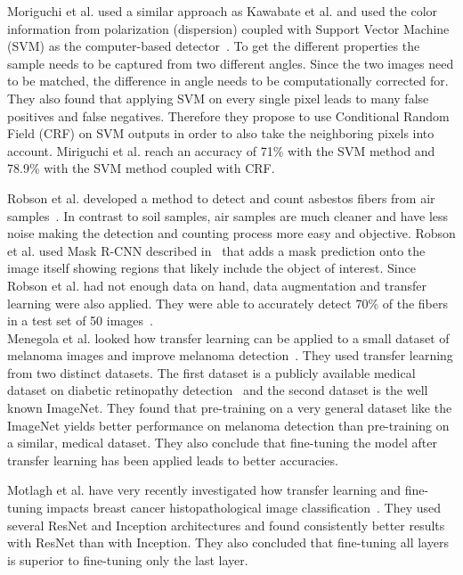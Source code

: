 Moriguchi et al. used a similar approach as Kawabate et al. and used the color information from polarization (dispersion) coupled with Support Vector Machine (SVM) as the computer-based detector~\cite{moriguchi2008asbestos}. To get the different properties the sample needs to be captured from two different angles. Since the two images need to be matched, the difference in angle needs to be computationally corrected for. They also found that applying SVM on every single pixel leads to many false positives and false negatives. Therefore they propose to use Conditional Random Field (CRF) on SVM outputs in order to also take the neighboring pixels into account. Miriguchi et al. reach an accuracy of 71\% with the SVM method and 78.9\% with the SVM method coupled with CRF.

Robson et al. developed a method to detect and count asbestos fibers from air samples~\cite{robson2018fiac}. In contrast to soil samples, air samples are much cleaner and have less noise making the detection and counting process more easy and objective. Robson et al. used Mask R-CNN described in~\cite{he2017mask} that adds a mask prediction onto the image itself showing regions that likely include the object of interest. Since Robson et al. had not enough data on hand, data augmentation and transfer learning were also applied. They were able to accurately detect 70\% of the fibers in a test set of 50 images~\cite{robson2018fiac}. \\

Menegola et al. looked how transfer learning can be applied to a small dataset of melanoma images and improve melanoma detection~\cite{menegola2017knowledge}. They used transfer learning from two distinct datasets. The first dataset is a publicly available medical dataset on diabetic retinopathy detection~\cite{diabeticRetinopathy} and the second dataset is the well known ImageNet. They found that pre-training on a very general dataset like the ImageNet yields better performance on melanoma detection than pre-training on a similar, medical dataset. They also conclude that fine-tuning the model after transfer learning has been applied leads to better accuracies.

Motlagh et al. have very recently investigated how transfer learning and fine-tuning impacts breast cancer histopathological image classification~\cite{motlagh2018breast}. They used several ResNet and Inception architectures and found consistently better results with ResNet than with Inception. They also concluded that fine-tuning all layers is superior to fine-tuning only the last layer.

